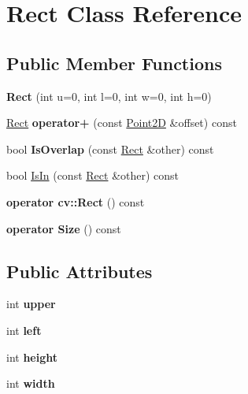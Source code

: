 \hypertarget{classRect}{}\section{Rect Class Reference}
\label{classRect}
\subsection*{Public Member Functions}
\begin{DoxyCompactItemize}
\item 
\hypertarget{classRect_ad197c38803bb8538dd04e5a92b5e12e6}{}{\bfseries Rect} (int u=0, int l=0, int w=0, int h=0)\label{classRect_ad197c38803bb8538dd04e5a92b5e12e6}

\item 
\hypertarget{classRect_a7fbb8992edb8c3839c83045213d21631}{}\hyperlink{classRect}{Rect} {\bfseries operator+} (const \hyperlink{classPoint2D}{Point2\+D} \&offset) const \label{classRect_a7fbb8992edb8c3839c83045213d21631}

\item 
\hypertarget{classRect_a90d8491cab865d559ccb00fe88027714}{}bool {\bfseries Is\+Overlap} (const \hyperlink{classRect}{Rect} \&other) const \label{classRect_a90d8491cab865d559ccb00fe88027714}

\item 
bool \hyperlink{classRect_a3ab55f8bbc938075ff7a23fb95bfdd26}{Is\+In} (const \hyperlink{classRect}{Rect} \&other) const 
\item 
\hypertarget{classRect_afb25e86036b7faa93e86aee8ba24cd35}{}{\bfseries operator cv\+::\+Rect} () const \label{classRect_afb25e86036b7faa93e86aee8ba24cd35}

\item 
\hypertarget{classRect_a78ef656476b85aa5ba0f8dd70a6232d3}{}{\bfseries operator Size} () const \label{classRect_a78ef656476b85aa5ba0f8dd70a6232d3}

\end{DoxyCompactItemize}
\subsection*{Public Attributes}
\begin{DoxyCompactItemize}
\item 
\hypertarget{classRect_aaba0474a7052cee8cadd159c306e27bd}{}int {\bfseries upper}\label{classRect_aaba0474a7052cee8cadd159c306e27bd}

\item 
\hypertarget{classRect_ab0841a51d249d8560ddca36054fd1e57}{}int {\bfseries left}\label{classRect_ab0841a51d249d8560ddca36054fd1e57}

\item 
\hypertarget{classRect_ad79d7bf12771a81627a672452437011d}{}int {\bfseries height}\label{classRect_ad79d7bf12771a81627a672452437011d}

\item 
\hypertarget{classRect_a367714e71d566668addb140c7981b5bc}{}int {\bfseries width}\label{classRect_a367714e71d566668addb140c7981b5bc}

\end{DoxyCompactItemize}


